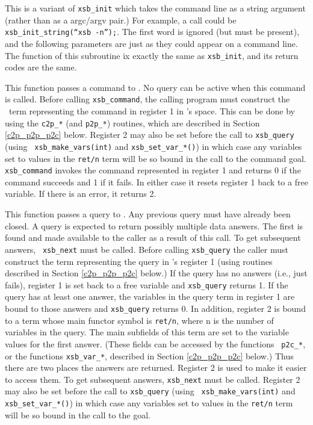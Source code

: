 {\begin{description}
 
This is a variant of {\tt xsb\_init} which takes the command line as a
string argument (rather than as a argc/argv pair.)  For example, a call
could be {\tt xsb\_init\_string(``xsb -n'');}.  The first
word is ignored (but must be present), and the following parameters are
just as they could appear on a command line.  The function of this
subroutine ix exactly the same as {\tt xsb\_init}, and its return codes
are the same.

 
This function passes a command to \ourprolog .  No query can be active
when this command is called.  Before calling {\tt xsb\_command}, the
calling program must construct the \ourprolog\ term representing the
command in register 1 in \ourprolog 's space.  This can be done by
using the {\tt c2p\_*} (and {\tt p2p\_*}) routines, which are
described in Section \ref{c2p_p2p_p2c} below.  Register 2 may also be
set before the call to {\tt xsb\_query} (using {\tt
xsb\_make\_vars(int)} and {\tt xsb\_set\_var\_*()}) in which case any
variables set to values in the {\tt ret/n} term will be so bound in
the call to the command goal.  {\tt xsb\_command} invokes the command
represented in register 1 and returns 0 if the command succeeds and 1
if it fails. In either case it resets register 1 back to a free
variable. If there is an error, it returns 2.

 
This function passes a query to \ourprolog .  Any previous query must
have already been closed.  A query is expected to return possibly
multiple data answers.  The first is found and made available to the
caller as a result of this call.  To get subsequent answers, {\tt
xsb\_next} must be called.  Before calling {\tt xsb\_query} the caller
must construct the term representing the query in \ourprolog 's
register 1 (using routines described in Section \ref{c2p_p2p_p2c}
below.)  If the query has no answers (i.e., just fails), register 1 is
set back to a free variable and {\tt xsb\_query} returns 1.  If the
query has at least one answer, the variables in the query term in
register 1 are bound to those answers and {\tt xsb\_query} returns 0.
In addition, register 2 is bound to a term whose main functor symbol
is {\tt ret/n}, where n is the number of variables in the query. The
main subfields of this term are set to the variable values for the
first answer. (These fields can be accessed by the functions {\tt
p2c\_*}, or the functions {\tt xsb\_var\_*}, described in Section
\ref{c2p_p2p_p2c} below.)  Thus there are two places the answers are
returned. Register 2 is used to make it easier to access them.  To get
subsequent answers, {\tt xsb\_next} must be called.  Register 2 may
also be set before the call to {\tt xsb\_query} (using {\tt
xsb\_make\_vars(int)} and {\tt xsb\_set\_var\_*()}) in which case any
variables set to values in the {\tt ret/n} term will be so bound in
the call to the goal.


\end{description}}
